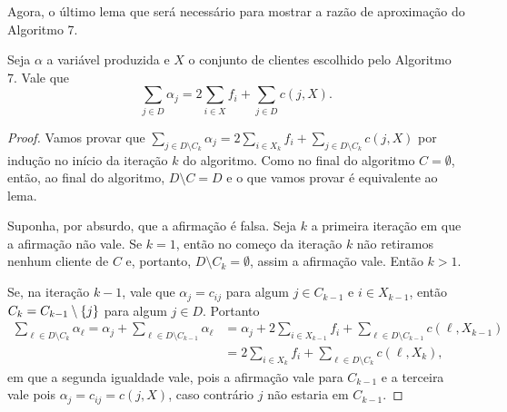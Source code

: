 Agora, o último lema que será necessário para mostrar a razão de aproximação do Algoritmo 7.

\begin{lemma}
\label{greedy:5}
Seja $\alpha$ a variável produzida e $X$ o conjunto de clientes escolhido pelo Algoritmo 7. Vale que 
\[ \sum_{j \in D} \alpha_j =  2\sum_{i \in X} f_i + \sum_{j \in D} c(j,X) .
\]
\end{lemma}

\begin{proof}
Vamos provar que $\sum_{j \in D \setminus C_k} \alpha_j = 2 \sum_{i \in X_k} f_i + \sum_{j \in D \setminus C_k} c(j,X) $ por indução no início da iteração $k$ do algoritmo. Como no final do algoritmo $C = \emptyset$, então, ao final do algoritmo, $D\setminus C = D$ e o que vamos provar é equivalente ao lema.

Suponha, por absurdo, que a afirmação é falsa. Seja $k$ a primeira iteração em que a afirmação não vale. Se $k=1$, então no começo da iteração $k$ não retiramos nenhum cliente de $C$ e, portanto, $D\setminus C_k = \emptyset$, assim a afirmação vale. Então $k > 1$.

Se, na iteração $k-1$, vale que $\alpha_j = c_{ij}$ para algum $j \in C_{k-1}$ e $i \in X_{k-1}$, então $C_k = C_{k-1} \setminus \{j\}$ para algum $j \in D$. Portanto 
\begin{subequations}
\begin{align*}
 \sum_{\ell \in D \setminus C_k} \alpha_\ell =  \alpha_j + \sum_{\ell \in D \setminus C_{k-1}} \alpha_\ell  &=  \alpha_j + 2 \sum_{i \in X_{k-1}} f_i +\sum_{\ell \in D\setminus  C_{k-1}}c(\ell,X_{k-1}) \\
 &= 2 \sum_{i \in X_{k}} f_i + \sum_{\ell \in D\setminus C_{k}}c(\ell,X_k) ,
\end{align*}
\end{subequations}
em que a segunda igualdade vale, pois a afirmação vale para $C_{k-1}$ e a terceira vale pois $\alpha_j = c_{ij} = c(j,X)$, caso contrário $j$ não estaria em $C_{k-1}$.


\end{proof}
